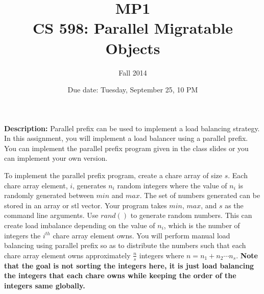 \documentclass{article}
\title{MP1 \\ CS 598: Parallel Migratable Objects}
\author{Fall 2014}
\date{Due date: Tuesday, September 25, 10 PM}
\begin{document}
\maketitle

\textbf{Description:} 
Parallel prefix can be used to implement a load balancing strategy. In this
assignment, you will implement a load balancer using a parallel prefix. You
can implement the parallel prefix program given in the class slides or you
can implement your own version. 


To implement the parallel prefix program, create a chare array of size $s$. Each
chare array element, $i$, generates $n_i$ random integers where the value of
$n_i$ is randomly generated between $min$ and $max$. The set of numbers generated
can be stored in an array or stl vector. Your program takes $min$,
$max$, and $s$ as the command line arguments. Use $rand()$ to generate random
numbers. This can create load imbalance depending on the value of $n_i$, which is
the number of integers the $i^{th}$ chare array element owns. You will perform manual load
balancing using parallel prefix so as to distribute the numbers such that each
chare array element owns approximately  $\frac{n}{s}$ integers where  $n = n_1 +
n_2 \cdots n_s$. \textbf{Note that the goal is not sorting the integers here, it is just load balancing the integers that each chare owns while keeping the order of the integers same globally.}\\


\end{document}
